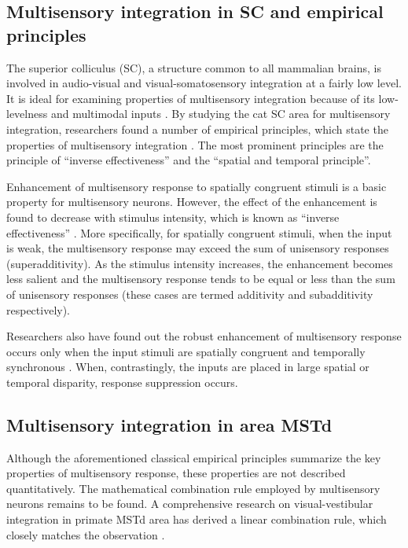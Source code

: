 \documentclass{article}[11pt]
\begin{document}

\subsection{Multisensory integration in SC and empirical principles}
The superior colliculus (SC), a structure common to all mammalian brains, is involved in audio-visual and visual-somatosensory integration at a fairly low level. It is ideal for examining properties of multisensory integration because of its low-levelness and multimodal inputs \cite{alais_multisensory_2010}.
By studying the cat SC area for multisensory integration, researchers found a number of empirical principles, which state the properties of multisensory integration \cite{stein_merging_1993}. The most prominent principles are the principle of ``inverse effectiveness'' and the ``spatial and temporal principle''.

Enhancement of multisensory response to spatially congruent stimuli is a basic property for multisensory neurons. However, the effect of the enhancement is found to decrease with stimulus intensity, which is known as ``inverse effectiveness'' \cite{meredith_visual_1986}. More specifically, for spatially congruent stimuli, when the input is weak, the multisensory response may exceed the sum of unisensory responses (superadditivity). As the stimulus intensity increases, the enhancement becomes less salient and the multisensory response tends to be equal or less than the sum of unisensory responses (these cases are termed additivity and subadditivity respectively).

Researchers also have found out the robust enhancement of multisensory response occurs only when the input stimuli are spatially congruent and temporally synchronous \cite{meredith_determinants_1987, meredith_spatial_1996}. When, contrastingly, the inputs are placed in large spatial or temporal disparity, response suppression occurs.

\subsection{Multisensory integration in area MSTd}
Although the aforementioned classical empirical principles summarize the key properties of multisensory response, these properties are not described quantitatively. The mathematical combination rule employed by multisensory neurons remains to be found. A comprehensive research on visual-vestibular integration in primate MSTd area has derived a linear combination rule, which closely matches the observation \cite{morgan_multisensory_2008}.
\end{document}
